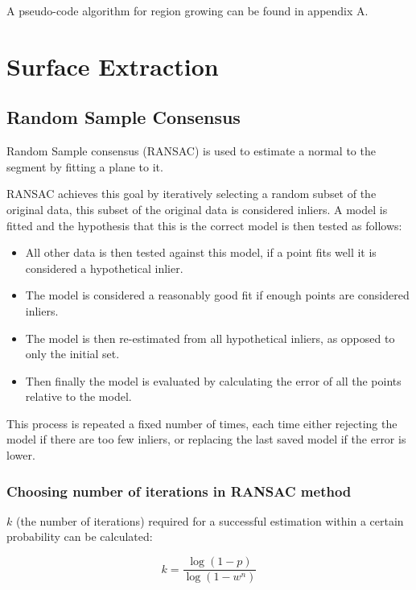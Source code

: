 		A pseudo-code algorithm for region growing can be found in appendix A.
		
	
\section{Surface Extraction}
	
		\subsection{Random Sample Consensus}
		\label{RANSAC expl}
			Random Sample consensus (RANSAC) is used to estimate a normal to the segment by fitting a plane to it.
			
			RANSAC achieves this goal by iteratively selecting a random subset of the original data, this subset of the original data is considered inliers. A model is fitted and the hypothesis that this is the correct model is then tested as follows:
			
			\begin{itemize}
				\item All other data is then tested against this model, if a point fits well it is considered a hypothetical inlier.
				
				\item The model is considered a reasonably good fit if enough points are considered inliers.
				
				\item The model is then re-estimated from all hypothetical inliers, as opposed to only the initial set.
				
				\item Then finally the model is evaluated by calculating the error of all the points relative to the model.
			\end{itemize}
			
			This process is repeated a fixed number of times, each time either rejecting the model if there are too few inliers, or replacing the last saved model if the error is lower.
			
			
			\subsubsection{Choosing number of iterations in RANSAC method}
				$k$ (the number of iterations) required for a successful estimation within a certain probability can be calculated:
				
				\begin{equation}
					k = \frac{\log(1-p)}{\log(1- w^n)}
				\end{equation}
				
